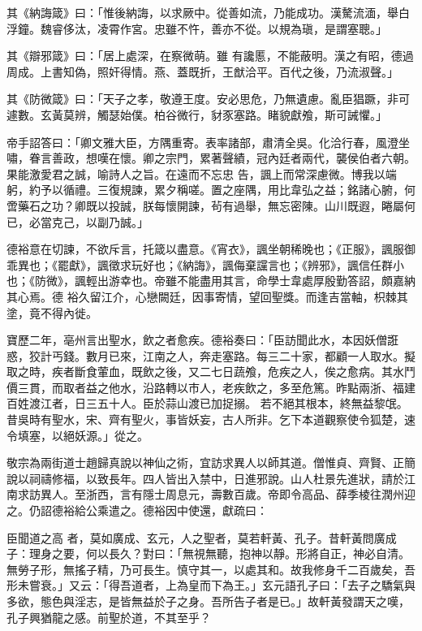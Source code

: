\begin{pinyinscope}
 其《納誨箴》曰：「惟後納誨，以求厥中。從善如流，乃能成功。漢驁流湎，舉白浮鐘。魏睿侈汰，凌霄作宮。忠雖不忤，善亦不從。以規為瑱，是謂塞聰。」



 其《辯邪箴》曰：「居上處深，在察微萌。雖
 有讒慝，不能蔽明。漢之有昭，德過周成。上書知偽，照奸得情。燕、蓋既折，王猷洽平。百代之後，乃流淑聲。」



 其《防微箴》曰：「天子之孝，敬遵王度。安必思危，乃無遺慮。亂臣猖蹶，非可遽數。玄黃莫辨，觸瑟始僕。柏谷微行，豺豕塞路。睹貌獻飧，斯可誡懼。」



 帝手詔答曰：「卿文雅大臣，方隅重寄。表率諸部，肅清全吳。化洽行春，風澄坐嘯，眷言善政，想嘆在懷。卿之宗門，累著聲績，冠內廷者兩代，襲侯伯者六朝。果能激愛君之誠，喻詩人之旨。在遠而不忘忠
 告，諷上而常深慮微。博我以端躬，約予以循禮。三復規諫，累夕稱嗟。置之座隅，用比韋弘之益；銘諸心腑，何啻藥石之功？卿既以投誠，朕每懷開諫，茍有過舉，無忘密陳。山川既遐，睠屬何已，必當克己，以副乃誠。」



 德裕意在切諫，不欲斥言，托箴以盡意。《宵衣》，諷坐朝稀晚也；《正服》，諷服御乖異也；《罷獻》，諷徵求玩好也；《納誨》，諷侮棄讜言也；《辨邪》，諷信任群小也；《防微》，諷輕出游幸也。帝雖不能盡用其言，命學士韋處厚殷勤答詔，頗嘉納其心焉。德
 裕久留江介，心戀闕廷，因事寄情，望回聖獎。而逢吉當軸，枳棘其塗，竟不得內徙。



 寶歷二年，亳州言出聖水，飲之者愈疾。德裕奏曰：「臣訪聞此水，本因妖僧誑惑，狡計丐錢。數月已來，江南之人，奔走塞路。每三二十家，都顧一人取水。擬取之時，疾者斷食葷血，既飲之後，又二七日蔬飧，危疾之人，俟之愈病。其水鬥價三貫，而取者益之他水，沿路轉以市人，老疾飲之，多至危篤。昨點兩浙、福建百姓渡江者，日三五十人。臣於蒜山渡已加捉搦。
 若不絕其根本，終無益黎氓。昔吳時有聖水，宋、齊有聖火，事皆妖妄，古人所非。乞下本道觀察使令狐楚，速令填塞，以絕妖源。」從之。



 敬宗為兩街道士趙歸真說以神仙之術，宜訪求異人以師其道。僧惟貞、齊賢、正簡說以祠禱修福，以致長年。四人皆出入禁中，日進邪說。山人杜景先進狀，請於江南求訪異人。至浙西，言有隱士周息元，壽數百歲。帝即令高品、薛季棱往潤州迎之。仍詔德裕給公乘遣之。德裕因中使還，獻疏曰：



 臣聞道之高
 者，莫如廣成、玄元，人之聖者，莫若軒黃、孔子。昔軒黃問廣成子：理身之要，何以長久？對曰：「無視無聽，抱神以靜。形將自正，神必自清。無勞子形，無搖子精，乃可長生。慎守其一，以處其和。故我修身千二百歲矣，吾形未嘗衰。」又云：「得吾道者，上為皇而下為王。」玄元語孔子曰：「去子之驕氣與多欲，態色與淫志，是皆無益於子之身。吾所告子者是已。」故軒黃發謂天之嘆，孔子興猶龍之感。前聖於道，不其至乎？




\end{pinyinscope}
